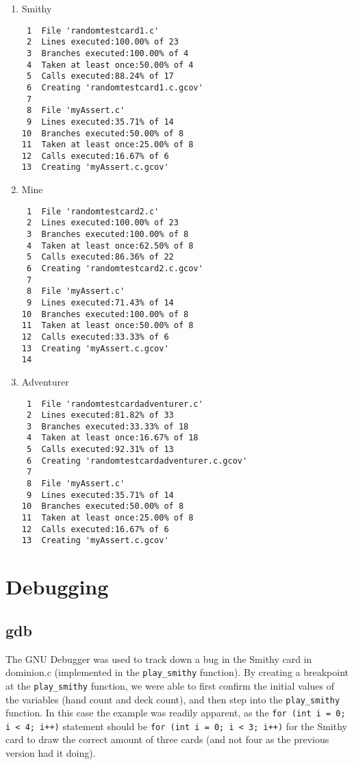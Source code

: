 \documentclass[11pt]{article}
\begin{document}
\begin{enumerate}
\item Smithy
\label{sec:smithy1}
\begin{verbatim}
 1  File 'randomtestcard1.c'
 2  Lines executed:100.00% of 23
 3  Branches executed:100.00% of 4
 4  Taken at least once:50.00% of 4
 5  Calls executed:88.24% of 17
 6  Creating 'randomtestcard1.c.gcov'
 7  
 8  File 'myAssert.c'
 9  Lines executed:35.71% of 14
10  Branches executed:50.00% of 8
11  Taken at least once:25.00% of 8
12  Calls executed:16.67% of 6
13  Creating 'myAssert.c.gcov'
\end{verbatim}

\item Mine
\label{sec:mine1}
\begin{verbatim}
 1  File 'randomtestcard2.c'
 2  Lines executed:100.00% of 23
 3  Branches executed:100.00% of 8
 4  Taken at least once:62.50% of 8
 5  Calls executed:86.36% of 22
 6  Creating 'randomtestcard2.c.gcov'
 7  
 8  File 'myAssert.c'
 9  Lines executed:71.43% of 14
10  Branches executed:100.00% of 8
11  Taken at least once:50.00% of 8
12  Calls executed:33.33% of 6
13  Creating 'myAssert.c.gcov'
14      
\end{verbatim}

\item Adventurer
\label{sec:adventurer1}
\begin{verbatim}
 1  File 'randomtestcardadventurer.c'
 2  Lines executed:81.82% of 33
 3  Branches executed:33.33% of 18
 4  Taken at least once:16.67% of 18
 5  Calls executed:92.31% of 13
 6  Creating 'randomtestcardadventurer.c.gcov'
 7  
 8  File 'myAssert.c'
 9  Lines executed:35.71% of 14
10  Branches executed:50.00% of 8
11  Taken at least once:25.00% of 8
12  Calls executed:16.67% of 6
13  Creating 'myAssert.c.gcov'
\end{verbatim}
\end{enumerate}


\section{Debugging}
\label{sec:debugging}
\subsection{gdb}
\label{sec:gdb}

The GNU Debugger was used to track down a bug in the Smithy card in dominion.c (implemented in the \texttt{play\_smithy} function). By creating a breakpoint at the \texttt{play\_smithy} function, we were able to first confirm the initial values of the variables (hand count and deck count), and then step into the \texttt{play\_smithy} function. In this case the example was readily apparent, as the \texttt{for (int i = 0; i < 4; i++)} statement should be \texttt{for (int i = 0; i < 3; i++)} for the Smithy card to draw the correct amount of three cards (and not four as the previous version had it doing).
\end{document}
